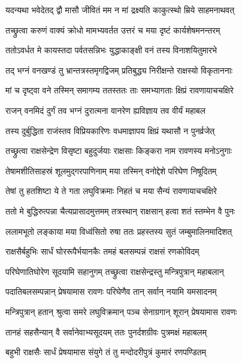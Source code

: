 \twolineshloka
{यदन्यथा भवेदेतद् द्वौ मासौ जीवितं मम}
{न मां द्रक्ष्यति काकुत्स्थो म्रिये साहमनाथवत्} %

\twolineshloka
{तच्छ्रुत्वा करुणं वाक्यं क्रोधो मामभ्यवर्तत}
{उत्तरं च मया दृष्टं कार्यशेषमनन्तरम्} %

\twolineshloka
{ततोऽवर्धत मे कायस्तदा पर्वतसन्निभः}
{युद्धाकाङ्क्षी वनं तस्य विनाशयितुमारभे} %

\twolineshloka
{तद् भग्नं वनखण्डं तु भ्रान्तत्रस्तमृगद्विजम्}
{प्रतिबुद्ध्य निरीक्षन्ते राक्षस्यो विकृताननाः} %

\twolineshloka
{मां च दृष्ट्वा वने तस्मिन् समागम्य ततस्ततः}
{ताः समभ्यागताः क्षिप्रं रावणायाचचक्षिरे} %

\twolineshloka
{राजन् वनमिदं दुर्गं तव भग्नं दुरात्मना}
{वानरेण ह्यविज्ञाय तव वीर्यं महाबल} %

\twolineshloka
{तस्य दुर्बुद्धिता राजंस्तव विप्रियकारिणः}
{वधमाज्ञापय क्षिप्रं यथासौ न पुनर्व्रजेत्} %

\twolineshloka
{तच्छ्रुत्वा राक्षसेन्द्रेण विसृष्टा बहुदुर्जयाः}
{राक्षसाः किङ्करा नाम रावणस्य मनोऽनुगाः} %

\twolineshloka
{तेषामशीतिसाहस्रं शूलमुद्गरपाणिनाम्}
{मया तस्मिन् वनोद्देशे परिघेण निषूदितम्} %

\twolineshloka
{तेषां तु हतशिष्टा ये ते गता लघुविक्रमाः}
{निहतं च मया सैन्यं रावणायाचचक्षिरे} %

\twolineshloka
{ततो मे बुद्धिरुत्पन्ना चैत्यप्रासादमुत्तमम्}
{तत्रस्थान् राक्षसान् हत्वा शतं स्तम्भेन वै पुनः} %

\twolineshloka
{ललामभूतो लङ्काया मया विध्वंसितो रुषा}
{ततः प्रहस्तस्य सुतं जम्बुमालिनमादिशत्} %

\twolineshloka
{राक्षसैर्बहुभिः सार्धं घोररूपैर्भयानकैः}
{तमहं बलसम्पन्नं राक्षसं रणकोविदम्} %

\twolineshloka
{परिघेणातिघोरेण सूदयामि सहानुगम्}
{तच्छ्रुत्वा राक्षसेन्द्रस्तु मन्त्रिपुत्रान् महाबलान्} %

\twolineshloka
{पदातिबलसम्पन्नान् प्रेषयामास रावणः}
{परिघेणैव तान् सर्वान् नयामि यमसादनम्} %

\twolineshloka
{मन्त्रिपुत्रान् हतान् श्रुत्वा समरे लघुविक्रमान्}
{पञ्च सेनाग्रगान् शूरान् प्रेषयामास रावणः} %

\twolineshloka
{तानहं सहसैन्यान् वै सर्वानेवाभ्यसूदयम्}
{ततः पुनर्दशग्रीवः पुत्रमक्षं महाबलम्} %

\twolineshloka
{बहुभी राक्षसैः सार्धं प्रेषयामास संयुगे}
{तं तु मन्दोदरीपुत्रं कुमारं रणपण्डितम्} %

